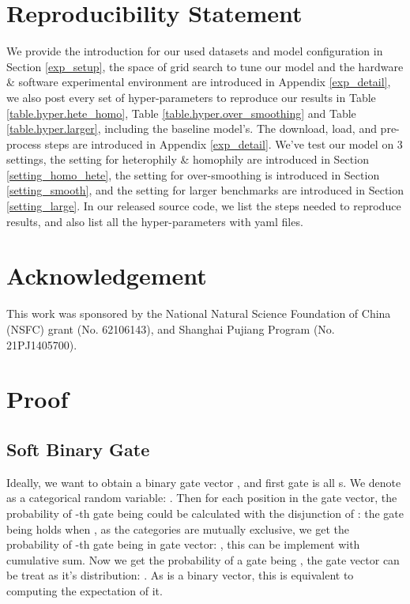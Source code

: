 \documentclass{article}
\begin{document}
\section{Reproducibility Statement}
We provide the introduction for our used datasets and model configuration in Section \ref{exp_setup}, the space of grid search to tune our model and the hardware \& software experimental environment are introduced in Appendix \ref{exp_detail}, we also post every set of hyper-parameters to reproduce our results in Table \ref{table.hyper.hete_homo}, Table \ref{table.hyper.over_smoothing} and Table \ref{table.hyper.larger}, including the baseline model's. The download, load, and pre-process steps are introduced in Appendix \ref{exp_detail}. We've test our model on 3 settings, the setting for heterophily \& homophily are introduced in Section \ref{setting_homo_hete}, the setting for over-smoothing is introduced in Section \ref{setting_smooth}, and the setting for larger benchmarks are introduced in Section \ref{setting_large}. In our released source code, we list the steps needed to reproduce results, and also list all the hyper-parameters with yaml files.

\section*{Acknowledgement}
This work was sponsored by the National Natural Science Foundation of China (NSFC) grant (No.
62106143), and Shanghai Pujiang Program (No. 21PJ1405700). 










\newpage
\appendix

\section{Proof}

\subsection{Soft Binary Gate}
\label{proof}
Ideally, we want to obtain a binary gate vector , and first  gate is all s. We denote  as a categorical random variable: . Then for each position  in the gate vector, the probability of -th gate  being  could be calculated with the disjunction of : the gate  being  holds when , as the categories are mutually exclusive, we get the probability of -th gate being  in gate vector: , this can be implement with cumulative sum. Now we get the 
probability of a gate being , the gate vector can be treat as it's distribution: . As  is a binary vector, this is equivalent to computing the expectation of it.
\end{document}
